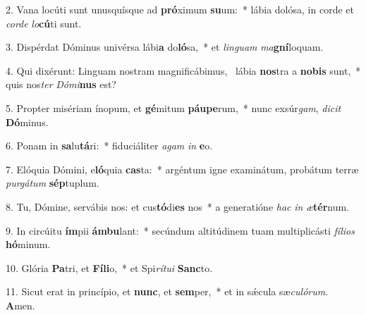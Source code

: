 2. Vana locúti sunt unusquísque ad \textbf{pró}ximum \textbf{su}um:~*  lábia dolósa, in corde et \textit{cor}\textit{de} \textit{lo}\textbf{cú}ti sunt.\

3. Dispérdat Dóminus univérsa lábi\textbf{a} do\textbf{ló}sa,~*  et \textit{lin}\textit{guam} \textit{ma}\textbf{gní}loquam.\

4. Qui dixérunt: Linguam nostram magnificábimus, \dag\  lábia \textbf{nos}tra a \textbf{no}\textbf{bis} sunt,~*  quis nos\textit{ter} \textit{Dó}\textit{mi}\textbf{nus} est?\

5. Propter misériam ínopum, et \textbf{gé}mitum \textbf{páu}\textbf{pe}rum,~*  nunc exsúr\textit{gam}, \textit{di}\textit{cit} \textbf{Dó}minus.\

6. Ponam in \textbf{sa}lu\textbf{tá}ri:~*  fiduciáliter \textit{a}\textit{gam} \textit{in} \textbf{e}o.\

7. Elóquia Dómini, e\textbf{ló}quia \textbf{cas}ta:~*  argéntum igne examinátum, probátum terræ \textit{pur}\textit{gá}\textit{tum} \textbf{sép}tuplum.\

8. Tu, Dómine, servábis nos: et cus\textbf{tó}di\textbf{es} nos~*  a generatióne \textit{hac} \textit{in} \textit{æ}\textbf{tér}num.\

9. In circúitu \textbf{ím}pii \textbf{ám}\textbf{bu}lant:~*  secúndum altitúdinem tuam multiplicásti \textit{fí}\textit{li}\textit{os} \textbf{hó}minum.\

10. Glória \textbf{Pa}tri, et \textbf{Fí}\textbf{li}o,~*  et Spi\textit{rí}\textit{tu}\textit{i} \textbf{Sanc}to.\

11. Sicut erat in princípio, et \textbf{nunc}, et \textbf{sem}per,~*  et in sǽcula sæ\textit{cu}\textit{ló}\textit{rum}. \textbf{A}men.\

